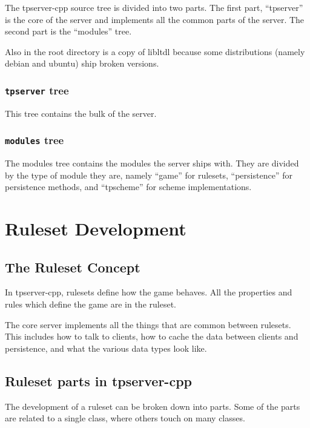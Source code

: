 \documentclass[a4paper,11pt]{report}
\begin{document}
The tpserver-cpp source tree is divided into two parts. The first part, ``tpserver'' is the core of the server and implements all the common parts of the server. The second part is the ``modules'' tree.

Also in the root directory is a copy of libltdl because some distributions (namely debian and ubuntu) ship broken versions.

\section{\texttt{tpserver} tree}
\label{sec:tree-tpserver}

This tree contains the bulk of the server.

\section{\texttt{modules} tree}
\label{sec:tree-modules}

The modules tree contains the modules the server ships with. They are divided by the type of module they are, namely ``game'' for rulesets, ``persistence'' for persistence methods, and ``tpscheme'' for scheme implementations.

\part{Ruleset Development}
\label{part:ruleset-dev}

\chapter{The Ruleset Concept}
\label{chap:ruleset-concept}

In tpserver-cpp, rulesets define how the game behaves.  All the properties and rules which define the game are in the ruleset.

The core server implements all the things that are common between rulesets. This includes how to talk to clients, how to cache the data between clients and persistence, and what the various data types look like.



\chapter{Ruleset parts in tpserver-cpp}
\label{chap:ruleset-parts}

The development of a ruleset can be broken down into parts. Some of the parts are related to a single class, where others touch on many classes.
\end{document}
